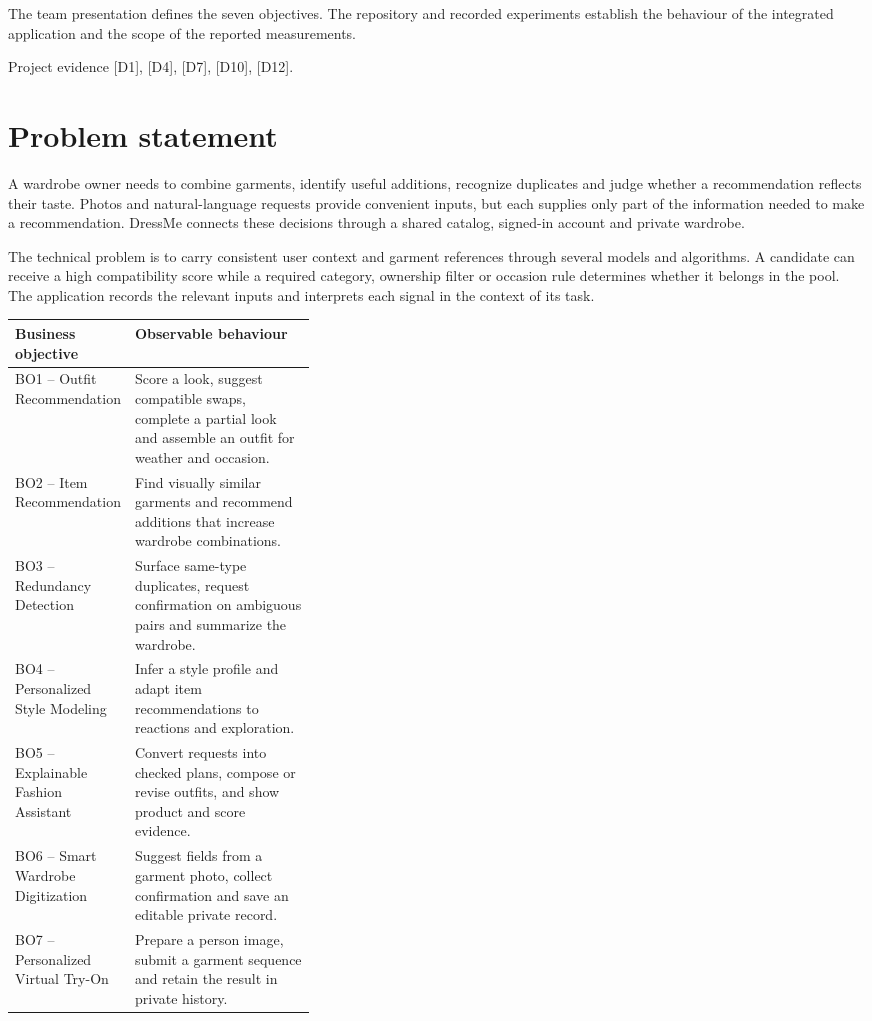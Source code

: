 \documentclass[11pt,a4paper]{article}
\newcommand{\src}[1]{\par{\footnotesize\textcolor{muted}{Project evidence #1.}}\par}
\begin{document}
The team presentation defines the seven objectives. The repository and recorded experiments establish the behaviour of the integrated application and the scope of the reported measurements.
\src{[D1], [D4], [D7], [D10], [D12]}
{\small\setlength{\parskip}{0pt}\tableofcontents}

\clearpage
\section{Problem statement}
A wardrobe owner needs to combine garments, identify useful additions, recognize duplicates and judge whether a recommendation reflects their taste. Photos and natural-language requests provide convenient inputs, but each supplies only part of the information needed to make a recommendation. DressMe connects these decisions through a shared catalog, signed-in account and private wardrobe.

The technical problem is to carry consistent user context and garment references through several models and algorithms. A candidate can receive a high compatibility score while a required category, ownership filter or occasion rule determines whether it belongs in the pool. The application records the relevant inputs and interprets each signal in the context of its task.

\begin{tabularx}{\linewidth}{@{}L{0.35\linewidth}Y@{}}
\toprule
\textbf{Business objective} & \textbf{Observable behaviour} \\
\midrule
BO1 -- Outfit Recommendation & Score a look, suggest compatible swaps, complete a partial look and assemble an outfit for weather and occasion. \\
BO2 -- Item Recommendation & Find visually similar garments and recommend additions that increase wardrobe combinations. \\
BO3 -- Redundancy Detection & Surface same-type duplicates, request confirmation on ambiguous pairs and summarize the wardrobe. \\
BO4 -- Personalized Style Modeling & Infer a style profile and adapt item recommendations to reactions and exploration. \\
BO5 -- Explainable Fashion Assistant & Convert requests into checked plans, compose or revise outfits, and show product and score evidence. \\
BO6 -- Smart Wardrobe Digitization & Suggest fields from a garment photo, collect confirmation and save an editable private record. \\
BO7 -- Personalized Virtual Try-On & Prepare a person image, submit a garment sequence and retain the result in private history. \\
\bottomrule
\end{tabularx}
\end{document}
